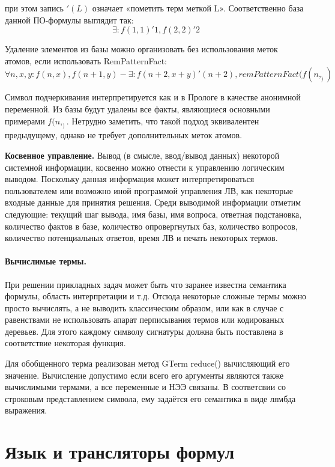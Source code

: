 при этом запись $'(L)$ означает «пометить терм меткой L». Соответственно база данной ПО-формулы выглядит так:
\begin{equation}
\exists\colon f(1,1)'1, f(2,2)'2
\end{equation}

Удаление элементов из базы можно организовать без использования меток атомов, если использовать RemPatternFact:
\begin{equation}
	\forall n,x,y\colon f(n,x),f(n+1,y) - \exists\colon f(n+2,x+y)'(n+2), remPatternFact(f(n,_))
\end{equation}

Символ подчеркивания интерпретируется как и в Прологе в качестве анонимной переменной. Из базы будут удалены все факты, являющиеся основными примерами  $f(n,_)$. Нетрудно заметить, что такой подход эквивалентен предыдущему, однако не требует дополнительных меток атомов.

\textbf{Косвенное управление.} Вывод (в смысле, ввод/вывод данных) некоторой системной информации, косвенно можно отнести к управлению логическим выводом. Поскольку данная информация может интерпретироваться пользователем или возможно иной программой управления ЛВ, как некоторые входные данные для принятия решения. Среди выводимой информации отметим следующие: текущий шаг вывода, имя базы, имя вопроса, ответная подстановка, количество фактов в базе, количество опровергнутых баз, количество вопросов, количество потенциальных ответов, время ЛВ и печать некоторых термов.

\paragraph{Вычислимые термы.} При решении прикладных задач может быть что заранее известна семантика формулы, область интерпретации и т.д. Отсюда некоторые сложные термы можно просто вычислять, а не выводить классическим образом, или как в случае с равенствами не использовать апарат перписывания термов или кодированых деревьев. Для этого каждому символу сигнатуры должна быть поставлена в соответствие некоторая функция.

Для обобщенного терма реализован метод GTerm reduce() вычисляющий его значение. Вычисление допустимо если всего его аргументы являются также вычислимыми термами, а все переменные и НЭЭ связаны. В соответсвии со строковым представлением символа, ему задаётся его семантика в виде лямбда выражения.


\section{Язык и трансляторы формул}

